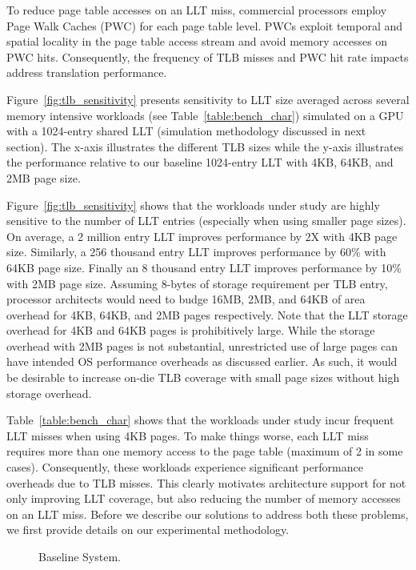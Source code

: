


To reduce page table accesses on an LLT miss, commercial processors
employ Page Walk Caches (PWC) for each page table level. PWCs exploit
temporal and spatial locality in the page table access stream and
avoid memory accesses on PWC hits. Consequently, the frequency of TLB
misses and PWC hit rate impacts address translation performance.

Figure~\ref{fig:tlb_sensitivity} presents sensitivity to LLT size
averaged across several memory intensive workloads (see
Table~\ref{table:bench_char}) simulated on a GPU with a 1024-entry
shared LLT (simulation methodology discussed in next section). The
x-axis illustrates the different TLB sizes while the y-axis
illustrates the performance relative to our baseline 1024-entry LLT
with 4KB, 64KB, and 2MB page size.



Figure~\ref{fig:tlb_sensitivity} shows that the workloads under study
are highly sensitive to the number of LLT entries (especially when
using smaller page sizes). On average, a 2 million entry LLT improves
performance by 2X with 4KB page size. Similarly, a 256 thousand entry
LLT improves performance by 60\% with 64KB page size. Finally an 8
thousand entry LLT improves performance by 10\% with 2MB page size.
Assuming 8-bytes of storage requirement per TLB entry, processor
architects would need to budge 16MB, 2MB, and 64KB of area overhead
for 4KB, 64KB, and 2MB pages respectively. Note that the LLT storage
overhead for 4KB and 64KB pages is prohibitively large. While the
storage overhead with 2MB pages is not substantial, unrestricted use
of large pages can have intended OS performance overheads as discussed
earlier. As such, it would be desirable to increase on-die TLB
coverage with small page sizes without high storage overhead.

Table~\ref{table:bench_char} shows that the workloads under study
incur frequent LLT misses when using 4KB pages. To make things worse,
each LLT miss requires more than one memory access to the page table
(maximum of 2 in some cases). Consequently, these workloads experience
significant performance overheads due to TLB misses. This clearly
motivates architecture support for not only improving LLT coverage,
but also reducing the number of memory accesses on an LLT miss. Before
we describe our solutions to address both these problems, we first
provide details on our experimental methodology.

\begin{figure}[t]
\vspace{0. in}
\centering
\centerline{}

        \caption{\small Baseline System. \normalsize}

\label{fig:config}
\vspace{-0.15 in}
\end{figure}

